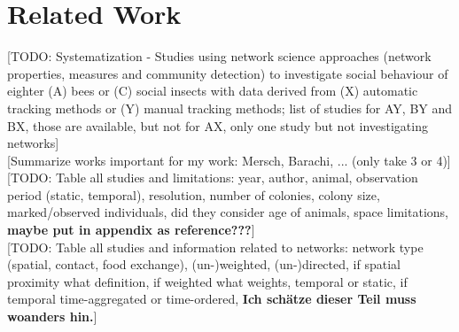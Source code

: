 \chapter{Related Work}
\label{ch:relatedwork}

[TODO: Systematization - Studies using network science approaches (network properties, measures and community detection) to investigate social behaviour of eighter (A) bees or (C) social insects with data derived from (X) automatic tracking methods or (Y) manual tracking methods; list of studies for AY, BY and BX, those are available, but not for AX, only one study but not investigating networks]\\

[Summarize works important for my work: Mersch, Barachi, ... (only take 3 or 4)]\\

[TODO: Table all studies and limitations: year, author, animal,  observation period (static, temporal), resolution, number of colonies, colony size, marked/observed individuals, did they consider age of animals, space limitations, \textbf{maybe put in appendix as reference???}]\\

[TODO: Table all studies and information related to networks: network type (spatial, contact, food exchange), (un-)weighted, (un-)directed, if spatial proximity what definition, if weighted what weights, temporal or static, if temporal time-aggregated or time-ordered, \textbf{Ich schätze dieser Teil muss woanders hin.}]\\